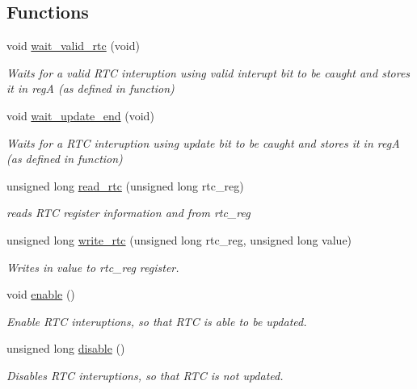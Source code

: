 \subsection*{Functions}
\begin{DoxyCompactItemize}
\item 
void \hyperlink{group___r_t_c_ga788e56085fe57e083210ad3c8887ecb1}{wait\-\_\-valid\-\_\-rtc} (void)
\begin{DoxyCompactList}\small\item\em Waits for a valid R\-T\-C interuption using valid interupt bit to be caught and stores it in reg\-A (as defined in function) \end{DoxyCompactList}\item 
void \hyperlink{group___r_t_c_gaa1d76ba59cc2d0563eb571c069df45de}{wait\-\_\-update\-\_\-end} (void)
\begin{DoxyCompactList}\small\item\em Waits for a R\-T\-C interuption using update bit to be caught and stores it in reg\-A (as defined in function) \end{DoxyCompactList}\item 
unsigned long \hyperlink{group___r_t_c_gae65aba4b5e09a53fec29c1fc2c41edd1}{read\-\_\-rtc} (unsigned long rtc\-\_\-reg)
\begin{DoxyCompactList}\small\item\em reads R\-T\-C register information and from rtc\-\_\-reg \end{DoxyCompactList}\item 
unsigned long \hyperlink{group___r_t_c_ga0cec5c0cb78d00ec71d0a2dd5b279790}{write\-\_\-rtc} (unsigned long rtc\-\_\-reg, unsigned long value)
\begin{DoxyCompactList}\small\item\em Writes in value to rtc\-\_\-reg register. \end{DoxyCompactList}\item 
void \hyperlink{group___r_t_c_ga486f22824bd83c5308a0d70ffac6f758}{enable} ()
\begin{DoxyCompactList}\small\item\em Enable R\-T\-C interuptions, so that R\-T\-C is able to be updated. \end{DoxyCompactList}\item 
unsigned long \hyperlink{group___r_t_c_ga32d3897a182f4b65dc7380e00a2c99f7}{disable} ()
\begin{DoxyCompactList}\small\item\em Disables R\-T\-C interuptions, so that R\-T\-C is not updated. \end{DoxyCompactList}\item 

\end{DoxyCompactItemize}
